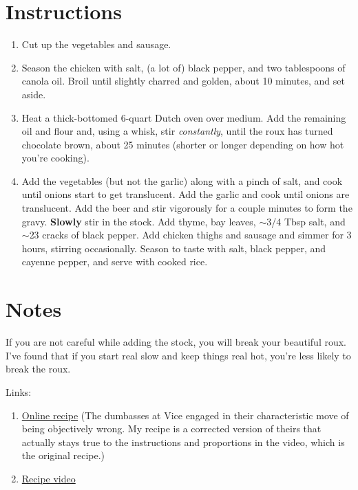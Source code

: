 \documentclass[11pt]{article}
\begin{document}
	\section*{Instructions}
	\begin{enumerate}
		\item Cut up the vegetables and sausage.
		\item Season the chicken with salt, (a lot of) black pepper, and two tablespoons of canola oil. Broil until slightly charred and golden, about 10 minutes, and set aside.
		\item Heat a thick-bottomed 6-quart Dutch oven over medium. Add the remaining oil and flour and, using a whisk, stir \textit{constantly}, until the roux has turned chocolate brown, about 25 minutes (shorter or longer depending on how hot you're cooking).
		\item Add the vegetables (but not the garlic) along with a pinch of salt, and cook until onions start to get translucent. Add the garlic and cook until onions are translucent. Add the beer and stir vigorously for a couple minutes to form the gravy. \textbf{Slowly} stir in the stock. Add thyme, bay leaves, $\sim$3/4 Tbsp salt, and $\sim$23 cracks of black pepper. Add chicken thighs and sausage and simmer for 3 hours, stirring occasionally. Season to taste with salt, black pepper, and cayenne pepper, and serve with cooked rice.
	\end{enumerate}

	\section*{Notes}
	If you are not careful while adding the stock, you will break your beautiful roux. I've found that if you start real slow and keep things real hot, you're less likely to break the roux.

	Links:
	\begin{enumerate}
		\item \href{https://www.vice.com/en/article/z489zy/chicken-and-andouille-sausage-gumbo}{Online recipe} (The dumbasses at Vice engaged in their characteristic move of being objectively wrong. My recipe is a corrected version of theirs that actually stays true to the instructions and proportions in the video, which is the original recipe.)
		\item \href{https://www.youtube.com/watch?v=76JXtB7JFQY}{Recipe video}
	\end{enumerate}
\end{document}
